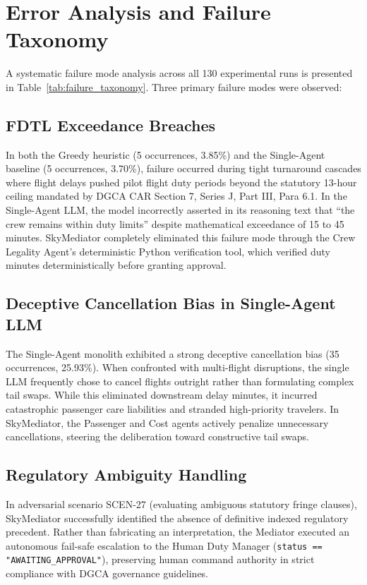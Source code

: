 \section{Error Analysis and Failure Taxonomy}
\label{sec:error_analysis}

A systematic failure mode analysis across all 130 experimental runs is presented in Table~\ref{tab:failure_taxonomy}. Three primary failure modes were observed:

\subsection{FDTL Exceedance Breaches}
In both the Greedy heuristic (5 occurrences, 3.85\%) and the Single-Agent baseline (5 occurrences, 3.70\%), failure occurred during tight turnaround cascades where flight delays pushed pilot flight duty periods beyond the statutory 13-hour ceiling mandated by DGCA CAR Section 7, Series J, Part III, Para 6.1. In the Single-Agent LLM, the model incorrectly asserted in its reasoning text that ``the crew remains within duty limits'' despite mathematical exceedance of 15 to 45 minutes. SkyMediator completely eliminated this failure mode through the Crew Legality Agent's deterministic Python verification tool, which verified duty minutes deterministically before granting approval.

\subsection{Deceptive Cancellation Bias in Single-Agent LLM}
The Single-Agent monolith exhibited a strong deceptive cancellation bias (35 occurrences, 25.93\%). When confronted with multi-flight disruptions, the single LLM frequently chose to cancel flights outright rather than formulating complex tail swaps. While this eliminated downstream delay minutes, it incurred catastrophic passenger care liabilities and stranded high-priority travelers. In SkyMediator, the Passenger and Cost agents actively penalize unnecessary cancellations, steering the deliberation toward constructive tail swaps.

\subsection{Regulatory Ambiguity Handling}
In adversarial scenario SCEN-27 (evaluating ambiguous statutory fringe clauses), SkyMediator successfully identified the absence of definitive indexed regulatory precedent. Rather than fabricating an interpretation, the Mediator executed an autonomous fail-safe escalation to the Human Duty Manager (\texttt{status == "AWAITING\_APPROVAL"}), preserving human command authority in strict compliance with DGCA governance guidelines.
